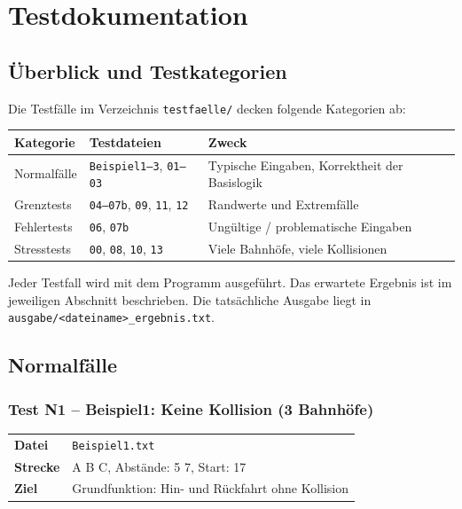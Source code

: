 \documentclass[12pt,a4paper]{article}
\begin{document}
\section{Testdokumentation}

\subsection{Überblick und Testkategorien}

Die Testfälle im Verzeichnis \texttt{testfaelle/} decken folgende Kategorien ab:

\begin{center}
\begin{tabular}{lll}
\toprule
\textbf{Kategorie} & \textbf{Testdateien} & \textbf{Zweck} \\
\midrule
Normalfälle & \texttt{Beispiel1--3}, \texttt{01--03} & Typische Eingaben, Korrektheit der Basislogik \\
Grenztests & \texttt{04--07b}, \texttt{09}, \texttt{11}, \texttt{12} & Randwerte und Extremfälle \\
Fehlertests & \texttt{06}, \texttt{07b} & Ungültige / problematische Eingaben \\
Stresstests & \texttt{00}, \texttt{08}, \texttt{10}, \texttt{13} & Viele Bahnhöfe, viele Kollisionen \\
\bottomrule
\end{tabular}
\end{center}

Jeder Testfall wird mit dem Programm ausgeführt. Das erwartete Ergebnis ist im jeweiligen Abschnitt beschrieben. Die tatsächliche Ausgabe liegt in \texttt{ausgabe/<dateiname>\_ergebnis.txt}.

\subsection{Normalfälle}

\subsubsection{Test N1 -- Beispiel1: Keine Kollision (3 Bahnhöfe)}

\begin{center}
\begin{tabular}{ll}
\toprule
\textbf{Datei} & \texttt{Beispiel1.txt} \\
\textbf{Strecke} & A B C, Abstände: 5 7, Start: 17 \\
\textbf{Ziel} & Grundfunktion: Hin- und Rückfahrt ohne Kollision \\
\bottomrule
\end{tabular}
\end{center}
\end{document}
